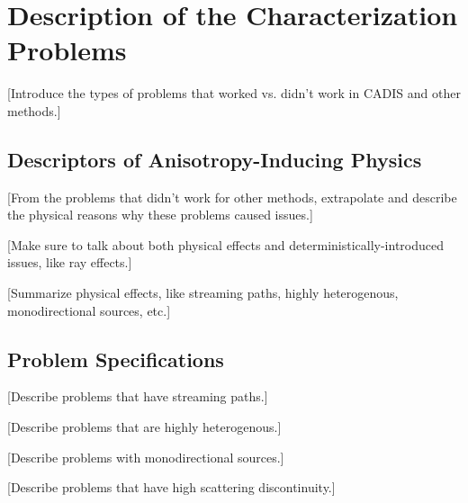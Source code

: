 \section{Description of the Characterization Problems}
\label{sec:AngleProbDesc}

[Introduce the types of problems that worked vs. didn't work in CADIS and other
methods.] \\

\subsection{Descriptors of Anisotropy-Inducing Physics}
\label{subsec:AngleProbDescriptors}

[From the problems that didn't work for other methods, extrapolate and describe
the physical reasons why these problems caused issues.]

[Make sure to talk about both physical effects and deterministically-introduced
issues, like ray effects.]

[Summarize physical effects, like streaming paths, highly heterogenous,
monodirectional sources, etc.]

\subsection{Problem Specifications}
\label{subsec:ProbSpecs}

[Describe problems that have streaming paths.]

[Describe problems that are highly heterogenous.]

[Describe problems with monodirectional sources.]

[Describe problems that have high scattering discontinuity.]

